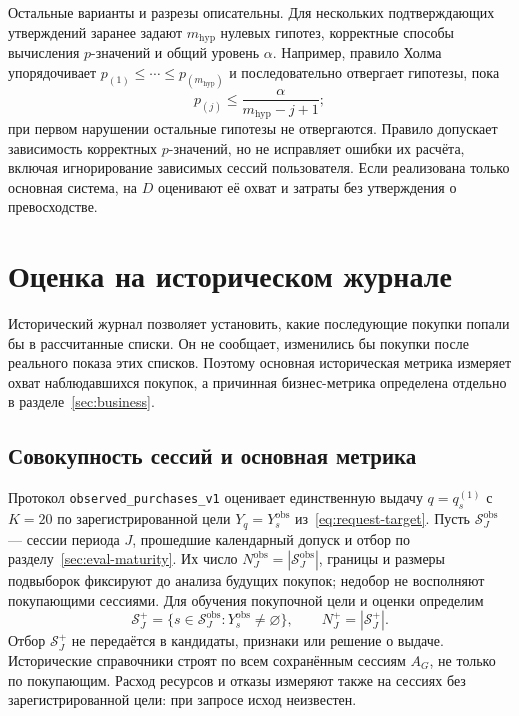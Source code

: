 \documentclass[12pt,a4paper]{article}
\newcommand{\code}[1]{{\ttfamily\small\nolinkurl{#1}}}
\theoremstyle{plainru}
\begin{document}
Остальные варианты и разрезы описательны. Для нескольких подтверждающих
утверждений заранее задают $m_{\mathrm{hyp}}$ нулевых гипотез,
корректные способы вычисления $p$-значений и общий уровень $\alpha$.
Например, правило Холма \cite{holm1979} упорядочивает
$p_{(1)}\le\cdots\le p_{(m_{\mathrm{hyp}})}$ и последовательно отвергает
гипотезы, пока
\begin{equation}\label{eq:eval-holm}
 p_{(j)}\le\frac{\alpha}{m_{\mathrm{hyp}}-j+1};
\end{equation}
при первом нарушении остальные гипотезы не отвергаются.
Правило допускает зависимость корректных $p$-значений, но не исправляет
ошибки их расчёта, включая игнорирование зависимых сессий пользователя.
Если реализована только основная система, на $D$ оценивают её охват
и затраты без утверждения о превосходстве.


\section{Оценка на историческом журнале}\label{sec:eval-offline}

Исторический журнал позволяет установить, какие последующие покупки
попали бы в рассчитанные списки. Он не сообщает, изменились бы покупки
после реального показа этих списков. Поэтому основная историческая
метрика измеряет охват наблюдавшихся покупок, а причинная бизнес-метрика
определена отдельно в разделе~\ref{sec:business}.

\subsection{Совокупность сессий и основная метрика}
\label{sec:eval-observed}\label{sec:eval-schedule}

Протокол \code{observed_purchases_v1} оценивает единственную выдачу
$q=q_s^{(1)}$ с $K=20$ по зарегистрированной цели
$Y_q=Y_s^{\mathrm{obs}}$ из~\eqref{eq:request-target}.
Пусть $\mathcal S_J^{\mathrm{obs}}$ --- сессии периода $J$, прошедшие
календарный допуск и отбор по разделу~\ref{sec:eval-maturity}.
Их число $N_J^{\mathrm{obs}}=|\mathcal S_J^{\mathrm{obs}}|$,
границы и размеры подвыборок фиксируют до анализа будущих покупок;
недобор не восполняют покупающими сессиями. Для обучения покупочной
цели и оценки определим
\begin{equation}\label{eq:eval-observed-cohort}
 \mathcal S_J^+=\{s\in\mathcal S_J^{\mathrm{obs}}:
 Y_s^{\mathrm{obs}}\ne\varnothing\},\qquad N_J^+=|\mathcal S_J^+|.
\end{equation}
Отбор $\mathcal S_J^+$ не передаётся в кандидаты, признаки или решение
о выдаче. Исторические справочники строят по всем сохранённым сессиям
$A_G$, не только по покупающим. Расход ресурсов и отказы измеряют
также на сессиях без зарегистрированной цели: при запросе исход неизвестен.
\end{document}

